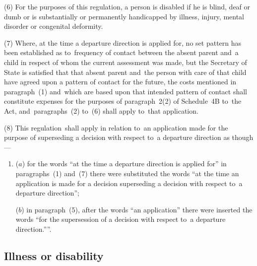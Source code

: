 \documentclass[12pt,a4paper]{article}
\begin{document}
(6) For the purposes of this regulation, a person is disabled if he is blind,
deaf or dumb or is substantially or permanently handicapped by illness, injury,
mental disorder or congenital deformity.

(7) Where, at the time a departure direction is applied for, no set pattern has
been established as to~frequency of contact between the absent parent and~a
child in respect of whom the current assessment was made, but the Secretary of
State is satisfied that that absent parent and~the person with care of that
child have agreed upon a pattern of contact for the future, the costs mentioned
in paragraph~(1) and~which are based upon that intended pattern of contact shall
constitute expenses for the purposes of paragraph~2(2) of Schedule~4B to~the
Act, and~paragraphs~(2) to~(6) shall apply to~that application.

(8) This regulation~shall apply in relation to~an application made for the purpose of superseding a decision with respect to~a departure direction as though---
\begin{enumerate}\item[]
($a$) for the words “at the time a departure direction is applied for” in paragraphs~(1) and~(7) there were substituted the words “at the time an application is made for a decision superseding a decision with respect to~a departure direction”;

($b$) in paragraph~(5), after the words “an application” there were inserted the words “for the supersession of a decision with respect to~a departure direction.””.
\end{enumerate}


\subsection[15. Illness or disability]{Illness or disability}
\end{document}
